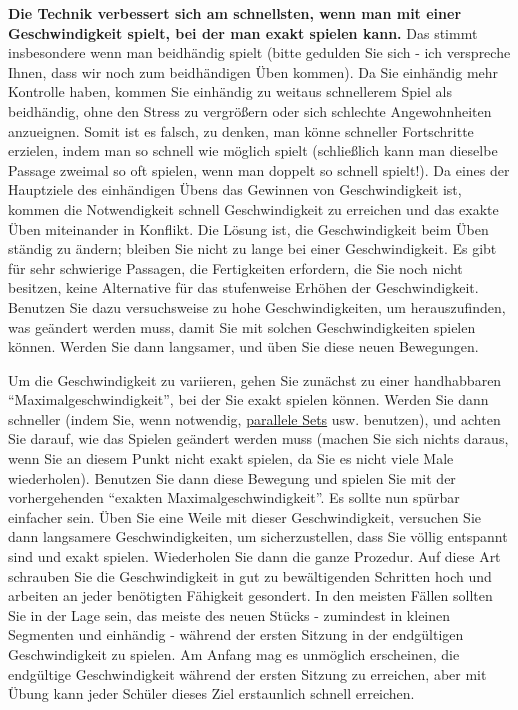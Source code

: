 \textbf{Die Technik verbessert sich am schnellsten, wenn man mit einer Geschwindigkeit spielt, bei der man exakt spielen kann.}
Das stimmt insbesondere wenn man beidhändig spielt (bitte gedulden Sie sich - ich verspreche Ihnen, dass wir noch zum beidhändigen Üben kommen).
Da Sie einhändig mehr Kontrolle haben, kommen Sie einhändig zu weitaus schnellerem Spiel als beidhändig, ohne den Stress zu vergrößern oder sich schlechte Angewohnheiten anzueignen.
Somit ist es falsch, zu denken, man könne schneller Fortschritte erzielen, indem man so schnell wie möglich spielt (schließlich kann man dieselbe Passage zweimal so oft spielen, wenn man doppelt so schnell spielt!).
Da eines der Hauptziele des einhändigen Übens das Gewinnen von Geschwindigkeit ist, kommen die Notwendigkeit schnell Geschwindigkeit zu erreichen und das exakte Üben miteinander in Konflikt.
Die Lösung ist, die Geschwindigkeit beim Üben ständig zu ändern; bleiben Sie nicht zu lange bei einer Geschwindigkeit.
Es gibt für sehr schwierige Passagen, die Fertigkeiten erfordern, die Sie noch nicht besitzen, keine Alternative für das stufenweise Erhöhen der Geschwindigkeit.
Benutzen Sie dazu versuchsweise zu hohe Geschwindigkeiten, um herauszufinden, was geändert werden muss, damit Sie mit solchen Geschwindigkeiten spielen können.
Werden Sie dann langsamer, und üben Sie diese neuen Bewegungen.

Um die Geschwindigkeit zu variieren, gehen Sie zunächst zu einer handhabbaren \enquote{Maximalgeschwindigkeit}, bei der Sie exakt spielen können.
Werden Sie dann schneller (indem Sie, wenn notwendig, \hyperlink{c1ii11}{parallele Sets} usw. benutzen), und achten Sie darauf, wie das Spielen geändert werden muss (machen Sie sich nichts daraus, wenn Sie an diesem Punkt nicht exakt spielen, da Sie es nicht viele Male wiederholen).
Benutzen Sie dann diese Bewegung und spielen Sie mit der vorhergehenden \enquote{exakten Maximalgeschwindigkeit}.
Es sollte nun spürbar einfacher sein.
Üben Sie eine Weile mit dieser Geschwindigkeit, versuchen Sie dann langsamere Geschwindigkeiten, um sicherzustellen, dass Sie völlig entspannt sind und exakt spielen.
Wiederholen Sie dann die ganze Prozedur.
Auf diese Art schrauben Sie die Geschwindigkeit in gut zu bewältigenden Schritten hoch und arbeiten an jeder benötigten Fähigkeit gesondert.
In den meisten Fällen sollten Sie in der Lage sein, das meiste des neuen Stücks - zumindest in kleinen Segmenten und einhändig - während der ersten Sitzung in der endgültigen Geschwindigkeit zu spielen.
Am Anfang mag es unmöglich erscheinen, die endgültige Geschwindigkeit während der ersten Sitzung zu erreichen, aber mit Übung kann jeder Schüler dieses Ziel erstaunlich schnell erreichen.
 

